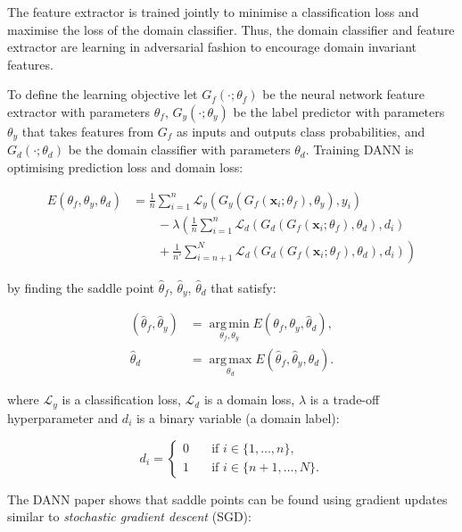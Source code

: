 The feature extractor is trained jointly to minimise a classification loss
and maximise the loss of the domain classifier.
Thus, the domain classifier and feature extractor are learning in adversarial fashion to encourage domain invariant features.

To define the learning objective let
\(G_f(\cdot; \theta_f)\) be the neural network feature extractor with parameters \(\theta_f\),
\(G_y(\cdot; \theta_y)\) be the label predictor with parameters \(\theta_y\)
that takes features from \(G_f\) as inputs and outputs class probabilities,
and \(G_d(\cdot; \theta_d)\) be the domain classifier with parameters \(\theta_d\). 
Training DANN is optimising prediction loss and domain loss:

\begin{align}
	E(\theta_f, \theta_y, \theta_d) &= \frac{1}{n} \sum^{n}_{i = 1} \mathcal{L}_y(G_y(G_f(\mathbf{x}_i; \theta_f), \theta_y), y_i) \nonumber \\
	&\qquad {} - \lambda \left(\frac{1}{n} \sum^{n}_{i = 1} \mathcal{L}_d(G_d(G_f(\mathbf{x}_i; \theta_f), \theta_d), d_i) \right. \nonumber \\
	&\qquad \left. {} + \frac{1}{n'} \sum^{N}_{i = n + 1} \mathcal{L}_d(G_d(G_f(\mathbf{x}_i; \theta_f), \theta_d), d_i)\right)
\end{align}

by finding the saddle point \(\hat{\theta}_f\), \(\hat{\theta}_y\), \(\hat{\theta}_d\) that satisfy:

\begin{align}
	(\hat{\theta}_f, \hat{\theta}_y)
	&= \operatorname*{arg\,min}_{\theta_f, \theta_y} E(\theta_f, \theta_y, \hat{\theta}_d),\\
	\hat{\theta}_d
	&= \operatorname*{arg\,max}_{\theta_d} E(\hat{\theta}_f, \hat{\theta}_y, \theta_d).
\end{align}

where \(\mathcal{L}_y\) is a classification loss,
\(\mathcal{L}_d\) is a domain loss,
\(\lambda\) is a trade-off hyperparameter
and \(d_i\) is a binary variable (a domain label):

\begin{equation}
	d_i =
	\begin{cases}
		0 & \quad \text{if } i \in \{1, \dots, n\}, \\
		1 & \quad \text{if } i \in \{n + 1, \dots, N\}.
	\end{cases}
\end{equation}

The DANN paper shows that saddle points can be found using gradient updates
similar to \textit{stochastic gradient descent} (SGD):

